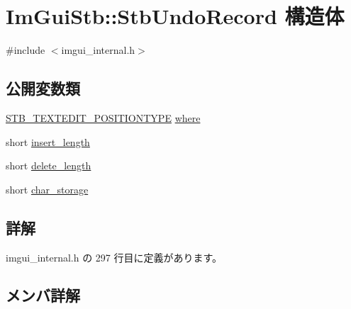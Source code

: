 \hypertarget{struct_im_gui_stb_1_1_stb_undo_record}{}\section{Im\+Gui\+Stb\+:\+:Stb\+Undo\+Record 構造体}
\label{struct_im_gui_stb_1_1_stb_undo_record}


{\ttfamily \#include $<$imgui\+\_\+internal.\+h$>$}

\subsection*{公開変数類}
\begin{DoxyCompactItemize}
\item 
\mbox{\hyperlink{stb__textedit_8h_a5d0c1b8751b6517e3d817f2a025ed654}{S\+T\+B\+\_\+\+T\+E\+X\+T\+E\+D\+I\+T\+\_\+\+P\+O\+S\+I\+T\+I\+O\+N\+T\+Y\+PE}} \mbox{\hyperlink{struct_im_gui_stb_1_1_stb_undo_record_acd3cbeaa50d642520c1a317c7d89a47b}{where}}
\item 
short \mbox{\hyperlink{struct_im_gui_stb_1_1_stb_undo_record_a588a05bfd8e4702d6af78d21141d3b89}{insert\+\_\+length}}
\item 
short \mbox{\hyperlink{struct_im_gui_stb_1_1_stb_undo_record_aca8b20387e3b7d890a21638109574279}{delete\+\_\+length}}
\item 
short \mbox{\hyperlink{struct_im_gui_stb_1_1_stb_undo_record_a5641d98f1c3611383d07cca2c5596a8e}{char\+\_\+storage}}
\end{DoxyCompactItemize}


\subsection{詳解}


 imgui\+\_\+internal.\+h の 297 行目に定義があります。



\subsection{メンバ詳解}
\mbox{\label{struct_im_gui_stb_1_1_stb_undo_record_a5641d98f1c3611383d07cca2c5596a8e}} 

